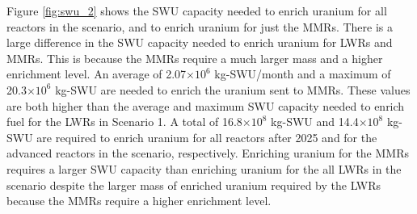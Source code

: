 Figure \ref{fig:swu_2} shows the \gls{SWU} capacity needed to 
enrich uranium for all reactors in the scenario, and to enrich uranium for 
just the \glspl{MMR}. There is a large difference in the \gls{SWU} 
capacity needed to enrich uranium for \glspl{LWR} and \glspl{MMR}. This 
is because the \glspl{MMR} require a much larger mass and 
a higher enrichment level. An average of 2.07$\times 10^6$ kg-\gls{SWU}/month
and a maximum of 20.3$\times 10^6$ kg-\gls{SWU}
are needed to enrich the uranium sent to \glspl{MMR}. These values are both 
higher than the 
average and maximum \gls{SWU} capacity needed to enrich fuel for the 
\glspl{LWR} in Scenario 1. A total of 16.8$\times 10^8$ kg-SWU and 14.4$\times 
10^8$ kg-SWU are required to enrich uranium for all reactors after 2025 and for 
the advanced reactors in the scenario, respectively. Enriching uranium for the 
\glspl{MMR} requires a larger \gls{SWU} capacity than enriching uranium for the 
all \glspl{LWR} in the scenario despite the larger mass of enriched uranium required 
by the \glspl{LWR} because the \glspl{MMR} require a higher enrichment level. 

